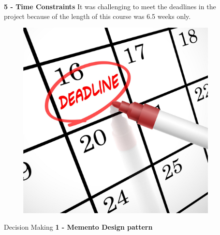 \documentclass[final]{beamer}
\newlength{\sepwid}
\newlength{\onecolwid}
\newlength{\twocolwid}
\begin{document}
\begin{frame}
\begin{columns}[t]
\begin{column}{\twocolwid}
\begin{columns}[t,totalwidth=\twocolwid]
\begin{column}{\onecolwid}

\end{column} %
\begin{column}{\sepwid}\end{column} %

\begin{column}{\onecolwid}\vspace{-.74in} %


\textbf{5 - Time Constraints}\newline
\justifying
It was challenging to meet the deadlines in the project because of the length of this course was 6.5 weeks only.\newline

\newline
\begin{figure}
\includegraphics[width=1\linewidth,height=0.9\linewidth]{img/deadline1.jpeg}\newline
\end{figure}

\begin{exampleblock}{Decision Making}
\textbf{1 - Memento Design pattern}\newline


\end{exampleblock}
\end{column}
\end{columns}
\end{column}
\end{columns}
\end{frame}
\end{document}
